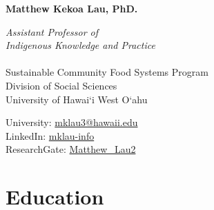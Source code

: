 \documentclass[a4paper]{article}
\author{}
\date{}
\begin{document}
\textbf{\Large Matthew Kekoa Lau, PhD.} \\

\hline

\begin{multicols}{2}
\textit{Assistant Professor of} \\
\textit{Indigenous Knowledge and Practice}\\
\\
Sustainable Community Food Systems Program\\
Division of Social Sciences \\
University of Hawai‘i West O‘ahu \\

\columnbreak

University: \href{mailto:mklau3@hawaii.edu}{mklau3@hawaii.edu} \\
LinkedIn: \href{www.linkedin.com/in/mklau-info/}{mklau-info} \\
ResearchGate: \href{www.researchgate.net/profile/Matthew_Lau2}{Matthew\_Lau2} \\

\end{multicols}

\section{Education}\label{education}
\end{document}
